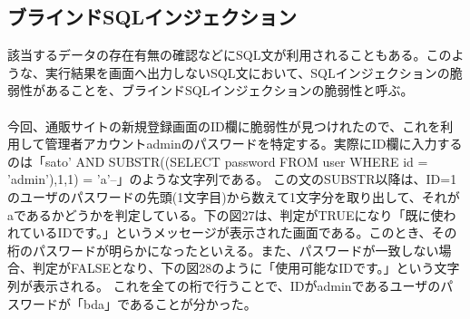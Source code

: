 \documentclass[dvipdfmx,autodetect-engine,titlepage]{jsarticle}
\begin{document}
\subsection{ブラインドSQLインジェクション}
該当するデータの存在有無の確認などにSQL文が利用されることもある。このような、実行結果を画面へ出力しないSQL文において、SQLインジェクションの脆弱性があることを、ブラインドSQLインジェクションの脆弱性と呼ぶ。\\\\
今回、通販サイトの新規登録画面のID欄に脆弱性が見つけれたので、これを利用して管理者アカウントadminのパスワードを特定する。実際にID欄に入力するのは「sato' AND SUBSTR((SELECT password FROM user WHERE id = 'admin'),1,1) = 'a'--」のような文字列である。
この文のSUBSTR以降は、ID=1のユーザのパスワードの先頭(1文字目)から数えて1文字分を取り出して、それがaであるかどうかを判定している。下の図27は、判定がTRUEになり「既に使われているIDです。」というメッセージが表示された画面である。このとき、その桁のパスワードが明らかになったといえる。また、パスワードが一致しない場合、判定がFALSEとなり、下の図28のように「使用可能なIDです。」という文字列が表示される。
これを全ての桁で行うことで、IDがadminであるユーザのパスワードが「bda」であることが分かった。
\end{document}
